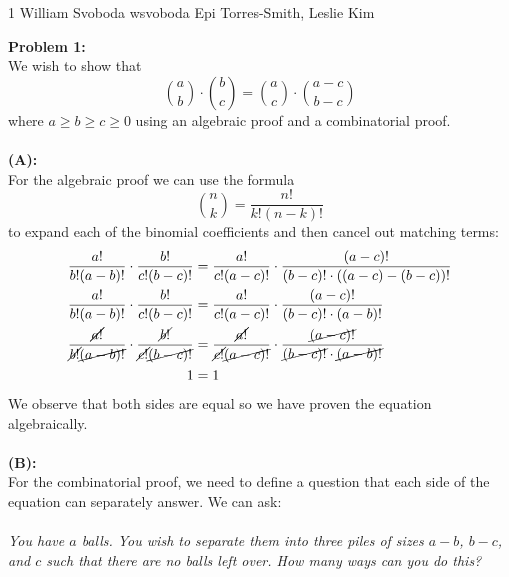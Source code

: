 \documentclass[12pt,letterpaper]{cos340hw}
\begin{document}
           {1}            %
           {William Svoboda}  %
           {wsvoboda}   %
           {Epi Torres-Smith, Leslie Kim} 




\noindent\textbf{Problem 1:}\\
We wish to show that
$$\binom{a}{b}\cdot\binom{b}{c}=\binom{a}{c}\cdot\binom{a-c}{b-c}$$
where $a \ge b \ge c \ge 0$ using an algebraic proof and a combinatorial proof.\\\\
\noindent\textbf{(A):}\\
For the algebraic proof we can use the formula
$$\binom{n}{k}=\frac{n!}{k!(n-k)!}$$
to expand each of the binomial coefficients and then cancel out matching terms:
\begin{align*}
\frac{a!}{b!(a-b)!}\cdot\frac{b!}{c!(b-c)!} & = \frac{a!}{c!(a-c)!}\cdot\frac{(a-c)!}{(b-c)!\cdot((a-c)-(b-c))!}\\
\frac{a!}{b!(a-b)!}\cdot\frac{b!}{c!(b-c)!} & = \frac{a!}{c!(a-c)!}\cdot\frac{(a-c)!}{(b-c)!\cdot(a-b)!}\\
\frac{\cancel{a!}}{\cancel{b!}\cancel{(a-b)!}}\cdot\frac{\cancel{b!}}{\cancel{c!}\cancel{(b-c)!}} & = \frac{\cancel{a!}}{\cancel{c!}\cancel{(a-c)!}}\cdot\frac{\cancel{(a-c)!}}{\cancel{(b-c)!}\cdot\cancel{(a-b)!}}\\
1 & = 1
\end{align*}
We observe that both sides are equal so we have proven the equation algebraically.\\\\
\noindent\textbf{(B):}\\
For the combinatorial proof, we need to define a question that each side of the equation can separately answer.
We can ask:\\\\
\emph{You have $a$ balls. You wish to separate them into three piles of sizes $a-b$, $b-c$, and $c$ such that there 
are no balls left over. How many ways can you do this?}\\\\
\end{document}
